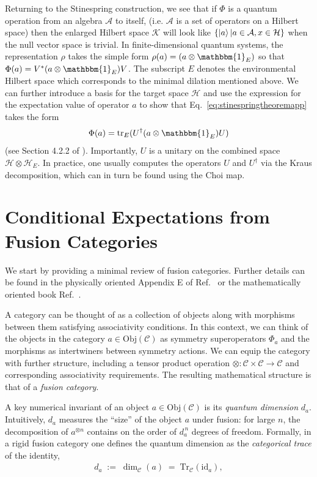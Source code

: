 \documentclass{article}
\newcommand{\mC}{\mathcal{C}}
\theoremstyle{definition}
\begin{document}
  Returning to the Stinespring construction, we see that if $\Phi$ is a quantum operation
  from an algebra $\mathcal{A}$ to itself, (i.e. $\mathcal{A}$ is a set of
  operators on a Hilbert space) then the enlarged Hilbert space $\mathcal{K}$ will
  look like $\{\ket{a}| a\in\mathcal{A}, x \in \mathcal{H}\}$ when the null vector
  space is trivial. In finite-dimensional quantum systems, the representation $\rho$
  takes the simple form $\rho(a) = (a \otimes \mathbbm{1}_{E})$ so that $\Phi(a)
  = V^{*}(a \otimes \mathbbm{1}_{E}) V$. The subscript $E$ denotes the
  environmental Hilbert space which corresponds to the minimal dilation
  mentioned above. We can further introduce a basis for the target space $\mathcal{H}$
  and use the expression for the expectation value of operator $a$ to show that Eq.~\ref{eq:stinespringtheoremapp}
  takes the form
  \[
    \Phi(a) = \textrm{tr}_{E}(U^{\dagger}(a\otimes \mathbbm{1}_{E})U)
  \]
  (see Section 4.2.2 of \cite{Heinosaari_Ziman_2011}). Importantly, $U$ is a unitary
  on the combined space $\mathcal{H}\otimes \mathcal{H}_{E}$. In practice, one usually
  computes the operators $U$ and $U^{\dagger}$ via the Kraus decomposition,
  which can in turn be found using the Choi map.

  \section{Conditional Expectations from Fusion Categories}
  \label{sec:condexp}

  We start by providing a minimal review of fusion categories. Further details
  can be found in the physically oriented Appendix E of Ref.~\cite{Kitaev_2006} or
  the mathematically oriented book Ref.~\cite{etingof2015tensor}.

  A category can be thought of as a collection of objects along with morphisms
  between them satisfying associativity conditions. In this context, we can
  think of the objects in the category $a\in \text{Obj}(\mathcal{C})$ as
  symmetry superoperators $\Phi_{a}$ and the morphisms as intertwiners between
  symmetry actions. We can equip the category with further structure, including
  a tensor product operation $\otimes: \mC \times \mC \rightarrow \mC$ and
  corresponding associativity requirements. The resulting mathematical structure
  is that of a \textit{fusion category}.

  A key numerical invariant of an object $a\in \text{Obj}(\mC)$ is its \emph{quantum
  dimension} $d_{a}$. Intuitively, $d_{a}$ measures the ``size'' of the object $a$
  under fusion: for large $n$, the decomposition of $a^{\otimes n}$ contains on the
  order of $d_{a}^{\,n}$ degrees of freedom. Formally, in a rigid fusion category
  one defines the quantum dimension as the \emph{categorical trace} of the
  identity,
  \begin{eqnarray}
    d_a \;:=\; \dim_{\mathcal{C}}(a)\;=\;\mathrm{Tr}_{\mathcal{C}}(\mathrm{id}_a),
  \end{eqnarray}
\end{document}
